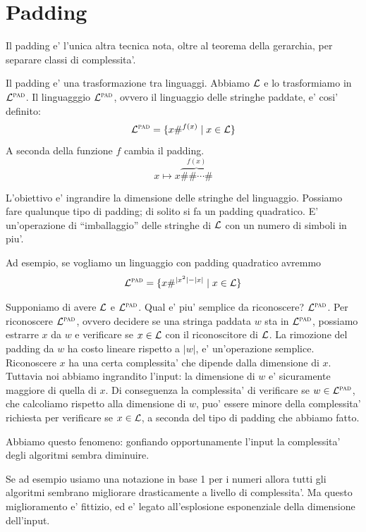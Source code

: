 \section{Padding}

Il padding e' l'unica altra tecnica nota, oltre al teorema della gerarchia, per separare classi di
complessita'.

Il padding e' una trasformazione tra linguaggi. Abbiamo $\mathcal{L}$ e lo trasformiamo in $\mathcal{L}^{\textsc{pad}}$.
Il linguagggio $\mathcal{L}^{\textsc{pad}}$, ovvero il linguaggio delle stringhe paddate, e' cosi' definito:
\begin{equation*}
    \mathcal{L}^{\textsc{pad}} = \{x\#^{f(x)} \mid x \in \mathcal{L}\}
\end{equation*}
A seconda della funzione $f$ cambia il padding.
\begin{equation*}
    x \mapsto x\overbrace{\#\#\cdots\#}^{f(x)}
\end{equation*}

L'obiettivo e' ingrandire la dimensione delle stringhe del linguaggio. Possiamo fare qualunque tipo
di padding; di solito si fa un padding quadratico. E' un'operazione di ``imballaggio'' delle
stringhe di $\mathcal{L}$ con un numero di simboli in piu'.

Ad esempio, se vogliamo un linguaggio con padding quadratico avremmo
\begin{equation*}
    \mathcal{L}^{\textsc{pad}} = \{x\#^{|x^{2}| - |x|} \mid x \in \mathcal{L}\}
\end{equation*}

Supponiamo di avere $\mathcal{L}$ e $\mathcal{L}^{\textsc{pad}}$. Qual e' piu' semplice da riconoscere? $\mathcal{L}^{\textsc{pad}}$. Per
riconoscere $\mathcal{L}^{\textsc{pad}}$, ovvero decidere se una stringa paddata $w$ sta in $\mathcal{L}^{\textsc{pad}}$, possiamo estrarre
$x$ da $w$ e verificare se $x \in \mathcal{L}$ con il riconoscitore di $\mathcal{L}$. La rimozione del padding
da $w$ ha costo lineare rispetto a $|w|$, e' un'operazione semplice. Riconoscere $x$ ha una certa
complessita' che dipende dalla dimensione di $x$. Tuttavia noi abbiamo ingrandito l'input: la
dimensione di $w$ e' sicuramente maggiore di quella di $x$. Di conseguenza la complessita' di
verificare se $w \in \mathcal{L}^{\textsc{pad}}$, che calcoliamo rispetto alla dimensione di $w$, puo' essere minore
della complessita' richiesta per verificare se $x \in \mathcal{L}$, a seconda del tipo di padding che
abbiamo fatto. 

Abbiamo questo fenomeno: gonfiando opportunamente l'input la complessita' degli algoritmi sembra
diminuire.

Se ad esempio usiamo una notazione in base 1 per i numeri allora tutti gli algoritmi sembrano
migliorare drasticamente a livello di complessita'. Ma questo miglioramento e' fittizio, ed e'
legato all'esplosione esponenziale della dimensione dell'input.

